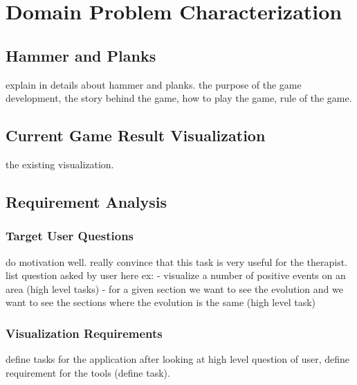 \chapter{Domain Problem Characterization}
\label{chap:back}

\section{Hammer and Planks}
explain in details about hammer and planks. the purpose of the game development, the story behind the game, how to play the game, rule of the game. 
\section{Current Game Result Visualization}
the existing visualization.
\section{Requirement Analysis}
\subsection{Target User Questions}
do motivation well. really convince that this task is very useful for the therapist.
list question asked by user here
ex: - visualize a number of positive events on an area (high level tasks)
		- for a given section we want to see the evolution and we want to see the sections where the evolution is the same (high level task)
\subsection{Visualization Requirements}
define tasks for the application
after looking at high level question of user, define requirement for the tools (define task).